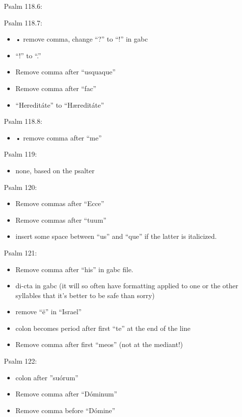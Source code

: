 \documentclass[11pt]{article}
\begin{document}
 Psalm 118.6:

 Psalm 118.7:
  \begin{itemize}
\item
•  remove comma, change ``?'' to ``!'' in gabc
 \item
 ``!'' to ``.''
  \item
 Remove comma after ``usquaque''
 \item
 Remove comma after ``fac''
 \item
 ``Hereditáte'' to  ``Hæreditáte''
  \end{itemize}
  
   Psalm 118.8:
  \begin{itemize}
  \item
•  remove comma after ``me''
  \end{itemize}

 Psalm 119:
  \begin{itemize}
  \item none, based on the psalter
    \end{itemize}

 Psalm 120:
  \begin{itemize}
  \item Remove commas after ``Ecce''
  \item  Remove commas after ``tuum''
  \item
  insert some space between ``us'' and ``que'' if the latter is italicized.
    \end{itemize}

   Psalm 121:
  \begin{itemize}
    \item Remove comma after ``his'' in gabc file.
        \item di-cta in gabc (it will so often have formatting applied to one or the other syllables that it's better to be safe than sorry)
        \item
        remove ``ë'' in ``Israel''
    \item colon becomes period after first ``te'' at the end of the line
    \item Remove comma after first ``meos'' (not at the mediant!)
      \end{itemize}
      
       Psalm 122:
  \begin{itemize}
  \item colon after ''suórum''
  \item  Remove comma after ``Dóminum''
    \item  Remove comma before ``Dómine''
    \end{itemize}
\end{document}
